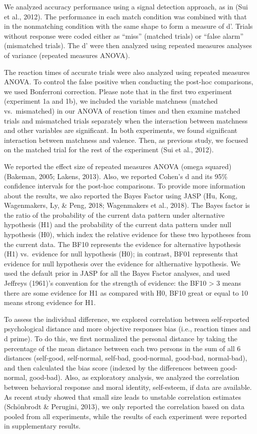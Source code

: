 \documentclass[man]{apa6}
\begin{document}
We analyzed accuracy performance using a signal detection approach, as in (Sui et al., 2012). The performance in each match condition was combined with that in the nonmatching condition with the same shape to form a measure of d'. Trials without response were coded either as \enquote{miss} (matched trials) or \enquote{false alarm} (mismatched trials). The d' were then analyzed using repeated measures analyses of variance (repeated measures ANOVA).

The reaction times of accurate trials were also analyzed using repeated measures ANOVA. To control the false positive when conducting the post-hoc comparisons, we used Bonferroni correction. Please note that in the first two experiment (experiment 1a and 1b), we included the variable matchness (matched vs.~mismatched) in our ANOVA of reaction times and then examine matched trials and mismatched trials separately when the interaction between matchness and other variables are significant. In both experiments, we found significant interaction between matchness and valence. Then, as previous study, we focused on the matched trial for the rest of the experiment (Sui et al., 2012).

We reported the effect size of repeated measures ANOVA (omega squared) (Bakeman, 2005; Lakens, 2013). Also, we reported Cohen's d and its 95\% confidence intervals for the post-hoc comparisons. To provide more information about the results, we also reported the Bayes Factor using JASP (Hu, Kong, Wagenmakers, Ly, \& Peng, 2018; Wagenmakers et al., 2018). The Bayes factor is the ratio of the probability of the current data pattern under alternative hypothesis (H1) and the probability of the current data pattern under null hypothesis (H0), which index the relative evidence for these two hypotheses from the current data. The BF10 represents the evidence for alternative hypothesis (H1) vs.~evidence for null hypothesis (H0); in contrast, BF01 represents that evidence for null hypothesis over the evidence for althernative hypothesis. We used the default prior in JASP for all the Bayes Factor analyses, and used Jeffreys (1961)'s convention for the strength of evidence: the BF10 \textgreater{} 3 means there are some evidence for H1 as compared with H0, BF10 great or equal to 10 means strong evidence for H1.

To assess the individual difference, we explored correlation between self-reported psychological distance and more objective responses bias (i.e., reaction times and d prime). To do this, we first normalized the personal distance by taking the percentage of the mean distance between each two persons in the sum of all 6 distances (self-good, self-normal, self-bad, good-normal, good-bad, normal-bad), and then calculated the bias score (indexed by the differences between good-normal, good-bad). Also, as exploratory analysis, we analyzed the correlation between behavioral response and moral identity, self-esteem, if data are available. As recent study showed that small size leads to unstable correlation estimates (Schönbrodt \& Perugini, 2013), we only reported the correlation based on data pooled from all experiments, while the results of each experiment were reported in supplementary results.
\end{document}
